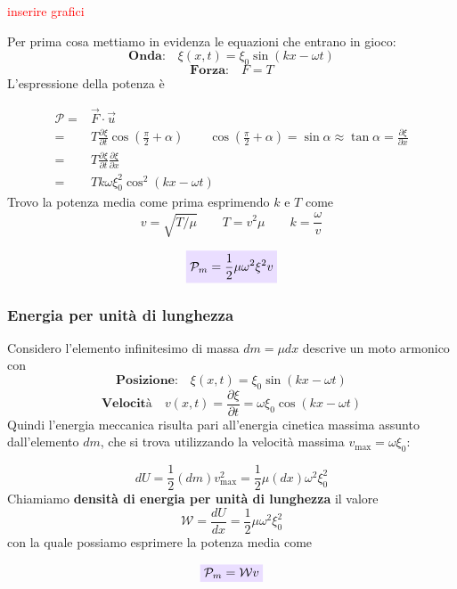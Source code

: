 \documentclass[x11names]{article}
\newcommand{\viola}[1]{\colorbox{myred}{$\displaystyle #1$}}
\begin{document}
	\begin{center}
		\textcolor{red}{inserire grafici}
	\end{center}
	
	\noindent
	Per prima cosa mettiamo in evidenza le equazioni che entrano in gioco:
	\[ 
	\textbf{Onda:} \quad \xi(x,t) = \xi_0\sin\left(kx - \omega t\right)
	\]
	\[ 
	\textbf{Forza:} \quad F = T
	\]
	L'espressione della potenza è 
	
	\begin{align*}
		\mathcal{P} =& \vec{F} \cdot \vec{u} \\
		=& T\frac{\partial\xi}{\partial t}\cos{\left(\frac{\pi}{2} + \alpha\right)} \qquad  \cos{\left(\frac{\pi}{2} + \alpha\right)} = \sin{\alpha} \approx \tan\alpha = \frac{\partial\xi}{\partial x} \\
		= & T\frac{\partial\xi}{\partial t}\frac{\partial\xi}{\partial x} \\
		=& Tk\omega \xi_0^2\cos^2\left(kx-\omega t\right)
	\end{align*}
	Trovo la potenza media come prima esprimendo \(k\) e \(T\) come
	\[ 
	\boxed{v = \sqrt{T/\mu} \qquad T = v^2 \mu} \qquad \boxed{k = \frac{\omega}{v}}
	\]
	
	\begin{equation}
		\viola{\mathcal{P}_m = \frac{1}{2}\mu\omega^2\xi^2v}
	\end{equation}
	
	
	\subsubsection{Energia per unità di lunghezza}
	Considero l'elemento infinitesimo di massa \(dm = \mu dx \) descrive un moto armonico con 
	\[ 
	\textbf{Posizione:} \quad \xi(x,t) = \xi_0\sin\left(kx - \omega t\right) 
	\]
	\[ 
	\textbf{Velocità} \quad v(x,t)= \frac{\partial\xi}{\partial t} = \omega \xi_0\cos\left(kx - \omega t\right) 
	\]
	Quindi l'energia meccanica risulta pari all'energia cinetica massima assunto dall'elemento \(dm\), che si trova utilizzando la velocità massima \(v_{\text{max}} = \omega \xi_0\):
	
	\[ 
	dU = \frac{1}{2}(dm)v_{\text{max}}^2 = \frac{1}{2}\mu(dx)\omega^2 \xi_0^2 
	\]
	Chiamiamo \textbf{densità di energia per unità di lunghezza} il valore 
	\[
	\mathcal{W} = \frac{dU}{dx} = \frac{1}{2}\mu \omega^2\xi_0^2
	\]
	con la quale possiamo esprimere la potenza media come 
	
	\begin{equation}
		\viola{\mathcal{P}_m = \mathcal{W} v}
	\end{equation}
\end{document}
